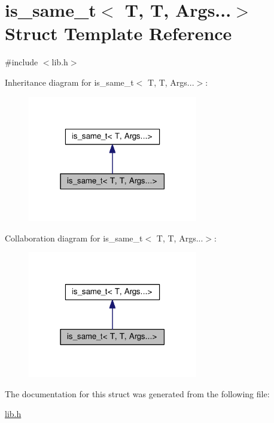 \hypertarget{structis__same__t_3_01T_00_01T_00_01Args_8_8_8_4}{\section{is\-\_\-same\-\_\-t$<$ T, T, Args...$>$ Struct Template Reference}
\label{structis__same__t_3_01T_00_01T_00_01Args_8_8_8_4}
}


{\ttfamily \#include $<$lib.\-h$>$}



Inheritance diagram for is\-\_\-same\-\_\-t$<$ T, T, Args...$>$\-:
\nopagebreak
\begin{figure}[H]
\begin{center}
\leavevmode
\includegraphics[width=210pt]{structis__same__t_3_01T_00_01T_00_01Args_8_8_8_4__inherit__graph}
\end{center}
\end{figure}


Collaboration diagram for is\-\_\-same\-\_\-t$<$ T, T, Args...$>$\-:
\nopagebreak
\begin{figure}[H]
\begin{center}
\leavevmode
\includegraphics[width=210pt]{structis__same__t_3_01T_00_01T_00_01Args_8_8_8_4__coll__graph}
\end{center}
\end{figure}


The documentation for this struct was generated from the following file\-:\begin{DoxyCompactItemize}
\item 
\hyperlink{lib_8h}{lib.\-h}\end{DoxyCompactItemize}
